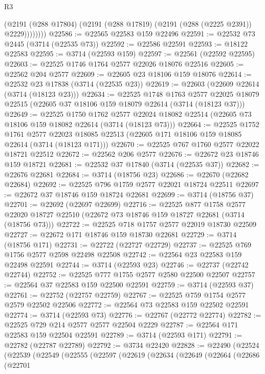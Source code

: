 \begin{lexlean}{R3}
\begin{coremodule}
              (@2191 (@288 @17804) (@2191 (@288 @17819) (@2191 (@288 (@2225 @2391)) @2229))))))))
@22586 := @22565 @22583 @159 @22496
@22591 := @22532 @73 @2445 (@3714 (@22535 @73))
@22592 := @22586 @22591
@22593 := @18122 @22583
@22595 := @3714 (@22593 @159)
@22597 := @22561 (@22592 @22595)
@22603 := @22525 @1746 @1764 @2577 @22026 @18076 @22516
@22605 := @22562 @204 @2577
@22609 := @22605 @23 @18106 @159 @18076
@22614 := @22532 @23 @17838 (@3714 (@22535 @23))
@22619 := @22603 (@22609 @22614 (@3714 (@18123 @23)))
@22634 := @22525
    @1748
    @1763
    @2577
    @22025
    @18079
    @22515
    (@22605 @37 @18106 @159 @18079 @22614 (@3714 (@18123 @37)))
@22649 := @22525
    @1750
    @1762
    @2577
    @22024
    @18082
    @22514
    (@22605 @73 @18106 @159 @18082 @22614 (@3714 (@18123 @73)))
@22664 := @22525
    @1752
    @1761
    @2577
    @22023
    @18085
    @22513
    (@22605 @171 @18106 @159 @18085 @22614 (@3714 (@18123 @171)))
@22670 := @22525 @767 @1760 @2577 @22022 @18721 @22512
@22672 := @22562 @206 @2577
@22676 := @22672 @23 @18746 @159 @18721
@22681 := @22532 @37 @17840 (@3714 (@22535 @37))
@22682 := @22676 @22681
@22684 := @3714 (@18756 @23)
@22686 := @22670 (@22682 @22684)
@22692 := @22525 @796 @1759 @2577 @22021 @18724 @22511
@22697 := @22672 @37 @18746 @159 @18724 @22681
@22699 := @3714 (@18756 @37)
@22701 := @22692 (@22697 @22699)
@22716 := @22525
    @877
    @1758
    @2577
    @22020
    @18727
    @22510
    (@22672 @73 @18746 @159 @18727 @22681 (@3714 (@18756 @73)))
@22722 := @22525 @718 @1757 @2577 @22019 @18730 @22509
@22727 := @22672 @171 @18746 @159 @18730 @22681
@22729 := @3714 (@18756 @171)
@22731 := @22722 (@22727 @22729)
@22737 := @22525 @769 @1756 @2577 @2598 @22498 @22508
@22742 := @22564 @23 @22583 @159 @22498 @22591
@22744 := @3714 (@22593 @23)
@22746 := @22737 (@22742 @22744)
@22752 := @22525 @777 @1755 @2577 @2580 @22500 @22507
@22757 := @22564 @37 @22583 @159 @22500 @22591
@22759 := @3714 (@22593 @37)
@22761 := @22752 (@22757 @22759)
@22767 := @22525 @759 @1754 @2577 @2579 @22502 @22506
@22772 := @22564 @73 @22583 @159 @22502 @22591
@22774 := @3714 (@22593 @73)
@22776 := @22767 (@22772 @22774)
@22782 := @22525 @729 @214 @2577 @2577 @22504 @2229
@22787 := @22564 @171 @22583 @159 @22504 @22591
@22789 := @3714 (@22593 @171)
@22791 := @22782 (@22787 @22789)
@22792 := @3734 @22420
@22828 := @22490
    (@22524
      (@22539
        (@22549
          (@22555
            (@22597
              (@22619
                (@22634
                  (@22649
                    (@22664
                      (@22686
                        (@22701

\end{coremodule}
\end{lexlean}

